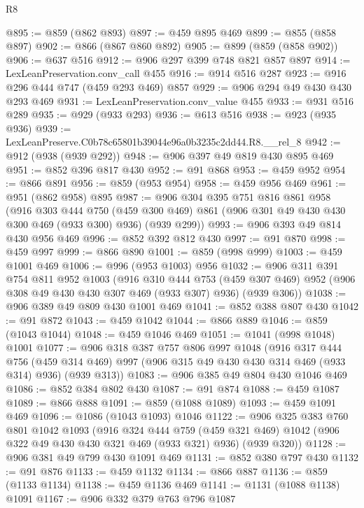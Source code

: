 \begin{lexlean}{R8}
\begin{coremodule}
@895 := @859 (@862 @893)
@897 := @459 @895 @469
@899 := @855 (@858 @897)
@902 := @866 (@867 @860 @892)
@905 := @899 (@859 (@858 @902))
@906 := @637 @516
@912 := @906 @297 @399 @748 @821 @857 @897
@914 := LexLeanPreservation.conv_call @455
@916 := @914 @516 @287
@923 := @916 @296 @444 @747 (@459 @293 @469) @857
@929 := @906 @294 @49 @430 @430 @293 @469
@931 := LexLeanPreservation.conv_value @455
@933 := @931 @516 @289
@935 := @929 (@933 @293)
@936 := @613 @516
@938 := @923 (@935 @936)
@939 := LexLeanPreserve.C0b78c65801b39044e96a0b3235c2dd44.R8.__rel_8
@942 := @912 (@938 (@939 @292))
@948 := @906 @397 @49 @819 @430 @895 @469
@951 := @852 @396 @817 @430
@952 := @91 @868
@953 := @459 @952
@954 := @866 @891
@956 := @859 (@953 @954)
@958 := @459 @956 @469
@961 := @951 (@862 @958) @895
@987 := @906
    @304
    @395
    @751
    @816
    @861
    @958
    (@916
      @303
      @444
      @750
      (@459 @300 @469)
      @861
      (@906 @301 @49 @430 @430 @300 @469 (@933 @300) @936)
      (@939 @299))
@993 := @906 @393 @49 @814 @430 @956 @469
@996 := @852 @392 @812 @430
@997 := @91 @870
@998 := @459 @997
@999 := @866 @890
@1001 := @859 (@998 @999)
@1003 := @459 @1001 @469
@1006 := @996 (@953 @1003) @956
@1032 := @906
    @311
    @391
    @754
    @811
    @952
    @1003
    (@916
      @310
      @444
      @753
      (@459 @307 @469)
      @952
      (@906 @308 @49 @430 @430 @307 @469 (@933 @307) @936)
      (@939 @306))
@1038 := @906 @389 @49 @809 @430 @1001 @469
@1041 := @852 @388 @807 @430
@1042 := @91 @872
@1043 := @459 @1042
@1044 := @866 @889
@1046 := @859 (@1043 @1044)
@1048 := @459 @1046 @469
@1051 := @1041 (@998 @1048) @1001
@1077 := @906
    @318
    @387
    @757
    @806
    @997
    @1048
    (@916
      @317
      @444
      @756
      (@459 @314 @469)
      @997
      (@906 @315 @49 @430 @430 @314 @469 (@933 @314) @936)
      (@939 @313))
@1083 := @906 @385 @49 @804 @430 @1046 @469
@1086 := @852 @384 @802 @430
@1087 := @91 @874
@1088 := @459 @1087
@1089 := @866 @888
@1091 := @859 (@1088 @1089)
@1093 := @459 @1091 @469
@1096 := @1086 (@1043 @1093) @1046
@1122 := @906
    @325
    @383
    @760
    @801
    @1042
    @1093
    (@916
      @324
      @444
      @759
      (@459 @321 @469)
      @1042
      (@906 @322 @49 @430 @430 @321 @469 (@933 @321) @936)
      (@939 @320))
@1128 := @906 @381 @49 @799 @430 @1091 @469
@1131 := @852 @380 @797 @430
@1132 := @91 @876
@1133 := @459 @1132
@1134 := @866 @887
@1136 := @859 (@1133 @1134)
@1138 := @459 @1136 @469
@1141 := @1131 (@1088 @1138) @1091
@1167 := @906
    @332
    @379
    @763
    @796
    @1087

\end{coremodule}
\end{lexlean}

